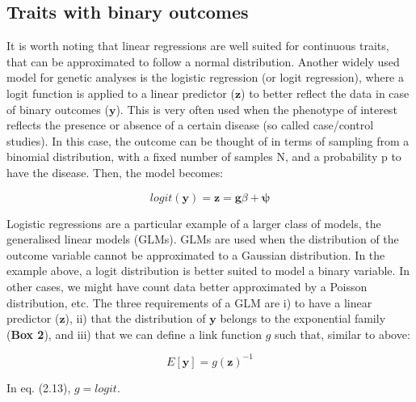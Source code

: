 \subsection{Traits with binary outcomes}

It is worth noting that linear regressions are well suited for continuous traits, that can be approximated to follow a normal distribution. 
Another widely used model for genetic analyses is the logistic regression (or logit regression), where a logit function is applied to a linear predictor ($\mathbf{z}$) to better reflect the data in case of binary outcomes ($\mathbf{y}$). 
This is very often used when the phenotype of interest reflects the presence or absence of a certain disease (so called case/control studies).
In this case, the outcome can be thought of in terms of sampling from a binomial distribution, with a fixed number of samples N, and a probability p to have the disease. Then, the model becomes:

\begin{equation}\label{eq13:Logistic_regression_genetics_z}
 logit(\mathbf{y}) = \mathbf{z} = \mathbf{g}\beta + \boldsymbol{\psi} 
\end{equation}

Logistic regressions are a particular example of a larger class of models, the generalised linear models (GLMs). 
GLMs are used when the distribution of the outcome variable cannot be approximated to a Gaussian distribution. 
In the example above, a logit distribution is better suited to model a binary variable. 
In other cases, we might have count data better approximated by a Poisson distribution, etc.
The three requirements of a GLM are i) to have a linear predictor ($\mathbf{z}$), ii) that the distribution of $\mathbf{y}$  belongs to the exponential family (\textbf{Box 2}), and iii) that we can define a link function $g$ such that, similar to above:

\begin{equation*}
 E[\mathbf{y}] = g(\mathbf{z})^{-1} 
\end{equation*}

In eq. (2.13), $ g = logit $.



\newpage

